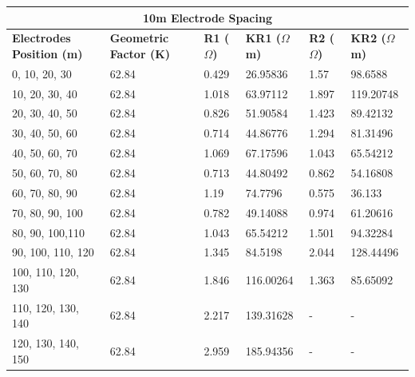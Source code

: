 \documentclass[12pt,a4paper]{report}
\begin{document}
\begin{itemize}
\begin{table}[H]
    \centering
    \begin{adjustbox}{max width=\textwidth}
    \setlength{\tabcolsep}{15pt}
    \renewcommand{\arraystretch}{1.5}
    \begin{tabular}{|p{3.5cm}|p{2.5cm}|p{2.0cm}|p{2.5cm}|p{2.0cm}|p{2.5cm}|}
    \hline
    \multicolumn{6}{|c|}{\rule{0pt}{2em}\huge\textbf{10m Electrode Spacing}} \\
    \hline
    \textbf{Electrodes Position (m)} & \textbf{Geometric Factor (K)} & \textbf{R1 ($\Omega$)} & \textbf{KR1 ($\Omega$m)} & \textbf{R2 ($\Omega$)} & \textbf{KR2 ($\Omega$m)}  \\ \hline
    0, 10, 20, 30   &	62.84 &	0.429 &	26.95836 &	1.57 &	98.6588 \\ \hline
    10, 20, 30, 40  &	62.84 &	1.018 &	63.97112 &	1.897 &	119.20748 \\ \hline
    20, 30, 40, 50  &	62.84 &	0.826 &	51.90584 &	1.423 &	89.42132 \\ \hline
    30, 40, 50, 60  &	62.84 &	0.714 &	44.86776 &	1.294 &	81.31496 \\ \hline
    40, 50, 60, 70  &	62.84 &	1.069 &	67.17596 &	1.043 &	65.54212 \\ \hline
    50, 60, 70, 80  &	62.84 &	0.713 &	44.80492 &	0.862 &	54.16808 \\ \hline
    60, 70, 80, 90  &	62.84 &	1.19 &	74.7796 &	0.575 &	36.133 \\ \hline
    70, 80, 90, 100 &	62.84 &	0.782 &	49.14088 &	0.974 &	61.20616 \\ \hline
    80, 90, 100,110 &	62.84 &	1.043 &	65.54212 &	1.501 &	94.32284 \\ \hline
    90, 100, 110, 120 &	62.84 &	1.345 &	84.5198 &	2.044 &	128.44496 \\ \hline
    100, 110, 120, 130 &	62.84 &	1.846 &	116.00264 &	1.363 &	85.65092 \\ \hline
    110, 120, 130, 140 &	62.84 &	2.217 &	139.31628 &	- &	- \\ \hline
    120, 130, 140, 150 &	62.84 &	2.959 &	185.94356 &	- &	- \\ \hline
    \end{tabular}
\end{adjustbox}
\end{table}


\end{itemize}
\end{document}
